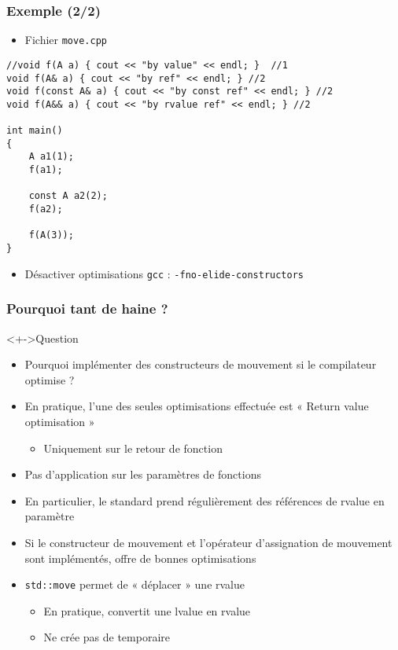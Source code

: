 \begin{frame}[containsverbatim]
\frametitle{Exemple (2/2)}
\begin{itemize}
\item Fichier \texttt{move.cpp}
\end{itemize}
\begin{lstlisting}
//void f(A a) { cout << "by value" << endl; }  //1
void f(A& a) { cout << "by ref" << endl; } //2
void f(const A& a) { cout << "by const ref" << endl; } //2
void f(A&& a) { cout << "by rvalue ref" << endl; } //2

int main()
{
    A a1(1);
    f(a1);
    
    const A a2(2);
    f(a2);
    
    f(A(3));
}
\end{lstlisting}
\begin{itemize}
\item Désactiver optimisations \texttt{gcc} : \texttt{-fno-elide-constructors}
\end{itemize}
\end{frame}

\begin{frame}
\frametitle{Pourquoi tant de haine ?}
\begin{exampleblock}<+->{Question}
	\begin{itemize}[<+->]
	\item Pourquoi implémenter des constructeurs de mouvement si le compilateur optimise ?
	\end{itemize}
\end{exampleblock}
\begin{itemize}[<+->]
\item En pratique, l'une des seules optimisations effectuée est « Return value optimisation »
	\begin{itemize}
	\item Uniquement sur le retour de fonction
	\end{itemize}
\item Pas d'application sur les paramètres de fonctions
\item En particulier, le standard prend régulièrement des références de rvalue en paramètre
\item Si le constructeur de mouvement et l'opérateur d'assignation de mouvement sont implémentés, offre de bonnes optimisations
\item \texttt{std::move} permet de « déplacer » une rvalue
	\begin{itemize}
	\item En pratique, convertit une lvalue en rvalue
	\item Ne crée pas de temporaire
	\end{itemize}
\end{itemize}
\end{frame}

